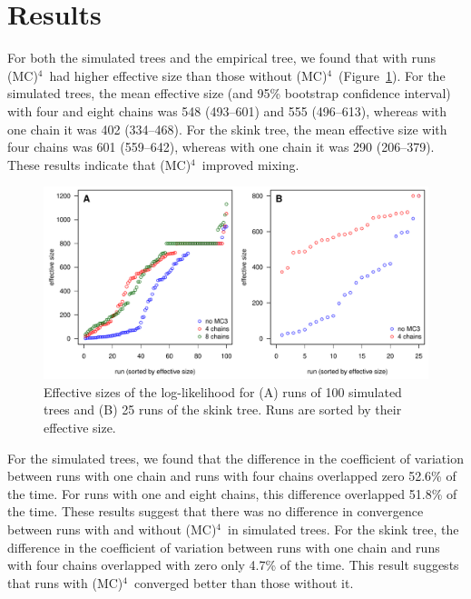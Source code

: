 \documentclass[12pt]{article}
\newcommand{\MCMCMCMC}{(MC)$^{4}$}
\begin{document}
\section*{Results}

For both the simulated trees and the empirical tree,
we found that with runs \MCMCMCMC\ had higher effective size
than those without \MCMCMCMC\ (Figure~\ref{fig:eff-size}).
%
For the simulated trees,
the mean effective size (and 95\% bootstrap confidence interval)
with four and eight chains was 548 (493--601) and 555 (496--613),
whereas with one chain it was 402 (334--468).
%
For the skink tree,
the mean effective size with four chains was 601 (559--642),
whereas with one chain it was 290 (206--379).
%
These results indicate that \MCMCMCMC\ improved mixing.

\begin{figure}
\begin{center}
\includegraphics[width=14cm]{eff-size.pdf}
\end{center}
\caption{Effective sizes of the log-likelihood for
    (A) runs of 100 simulated trees and (B) 25 runs of the skink tree.
    Runs are sorted by their effective size.}
\label{fig:eff-size}
\end{figure}


For the simulated trees,
we found that the difference in the coefficient of variation
between runs with one chain and runs with four chains
overlapped zero 52.6\% of the time.
%
For runs with one and eight chains,
this difference overlapped 51.8\% of the time.
%
These results suggest that there was no difference
in convergence between runs with and without \MCMCMCMC\ in simulated trees.
%
For the skink tree,
the difference in the coefficient of variation
between runs with one chain and runs with four chains
overlapped with zero only 4.7\% of the time.
%
This result suggests that runs with \MCMCMCMC\ 
converged better than those without it.
\end{document}
